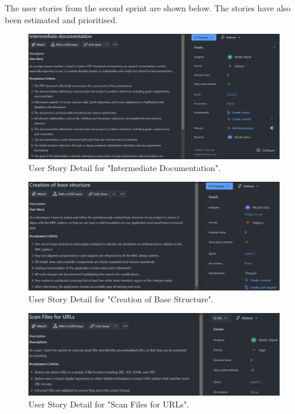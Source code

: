 The user stories from the second sprint are shown below. The stories have also been estimated and prioritised.
\begin{figure}[h!]
    \centering
    \includegraphics[width=1\textwidth]{pictures/sprint_2_userstory_1}
    \caption{User Story Detail for "Intermediate Documentation".}
    \label{fig:sprint_2_userstory_1}
\end{figure}
\begin{figure}[h!]
    \centering
    \includegraphics[width=1\textwidth]{pictures/sprint_2_userstory_2}
    \caption{User Story Detail for "Creation of Base Structure".}
    \label{fig:sprint_2_userstory_2}
\end{figure}
\begin{figure}[h!]
    \centering
    \includegraphics[width=1\textwidth]{pictures/sprint_2_userstory_3}
    \caption{User Story Detail for "Scan Files for URLs".}
    \label{fig:sprint_2_userstory_3}
\end{figure}
